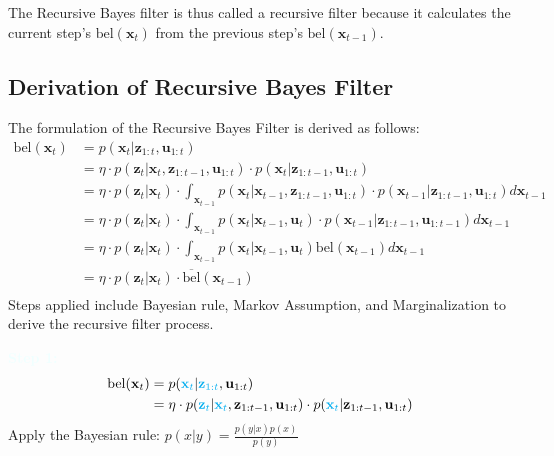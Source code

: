 \documentclass[10pt]{article}
\newcommand{\textbfazure}[1]{\textcolor{azure}{\textbf{#1}}}
\begin{document}
The Recursive Bayes filter is thus called a recursive filter because it calculates the current step's $\text{bel}(\mathbf{x}_{t})$ from the previous step's $\text{bel}(\mathbf{x}_{t-1})$.

	
\subsection{Derivation of Recursive Bayes Filter}
The formulation of the Recursive Bayes Filter is derived as follows:
\begin{equation}
	\begin{aligned}
		\text{bel}(\mathbf{x}_{t}) & = p( \mathbf{x}_{t}  | \mathbf{z}_{1:t}, \mathbf{u}_{1:t}) \\
		& = \eta \cdot p(\mathbf{z}_{t} |  \mathbf{x}_{t}, \mathbf{z}_{1:t-1}, \mathbf{u}_{1:t}) \cdot p( \mathbf{x}_{t} | \mathbf{z}_{1:t-1}, \mathbf{u}_{1:t}) \\
		& = \eta \cdot p(\mathbf{z}_{t} |  \mathbf{x}_{t}) \cdot \int_{\mathbf{x}_{t-1}} p( \mathbf{x}_{t} | \mathbf{x}_{t-1},\mathbf{z}_{1:t-1}, \mathbf{u}_{1:t}) \cdot p(\mathbf{x}_{t-1} | \mathbf{z}_{1:t-1}, \mathbf{u}_{1:t}) d\mathbf{x}_{t-1}\\
		& = \eta \cdot p(\mathbf{z}_{t} |  \mathbf{x}_{t}) \cdot \int_{\mathbf{x}_{t-1}} p( \mathbf{x}_{t} | \mathbf{x}_{t-1},\mathbf{u}_{t}) \cdot p(\mathbf{x}_{t-1} | \mathbf{z}_{1:t-1}, \mathbf{u}_{1:t-1}) d\mathbf{x}_{t-1} \\
		& = \eta \cdot p(\mathbf{z}_{t} |  \mathbf{x}_{t}) \cdot \int_{\mathbf{x}_{t-1}} p( \mathbf{x}_{t} | \mathbf{x}_{t-1},\mathbf{u}_{t}) \text{bel}(\mathbf{x}_{t-1}) d \mathbf{x}_{t-1} \\
		& = \eta \cdot p(\mathbf{z}_{t} |  \mathbf{x}_{t}) \cdot \overline{\text{bel}}(\mathbf{x}_{t-1}) \\
	\end{aligned} 
\end{equation}
Steps applied include Bayesian rule, Markov Assumption, and Marginalization to derive the recursive filter process.
	
\textbfazure{Step 1:}
\begin{equation}
	\begin{aligned}
		\text{bel}(\mathbf{x}_{t}) & = p({\color{Cyan} \mathbf{x}_{t} } | {\color{Cyan} \mathbf{z}_{1:t}}, \mathbf{u}_{1:t}) \\
		& = \eta \cdot p({\color{Cyan} \mathbf{z}_{t}} | {\color{Cyan} \mathbf{x}_{t}}, \mathbf{z}_{1:t-1}, \mathbf{u}_{1:t}) \cdot p( {\color{Cyan} \mathbf{x}_{t}} | \mathbf{z}_{1:t-1}, \mathbf{u}_{1:t})
	\end{aligned}
\end{equation}
Apply the Bayesian rule: $p(x|y) = \frac{p(y|x)p(x)}{p(y)}$
\end{document}
